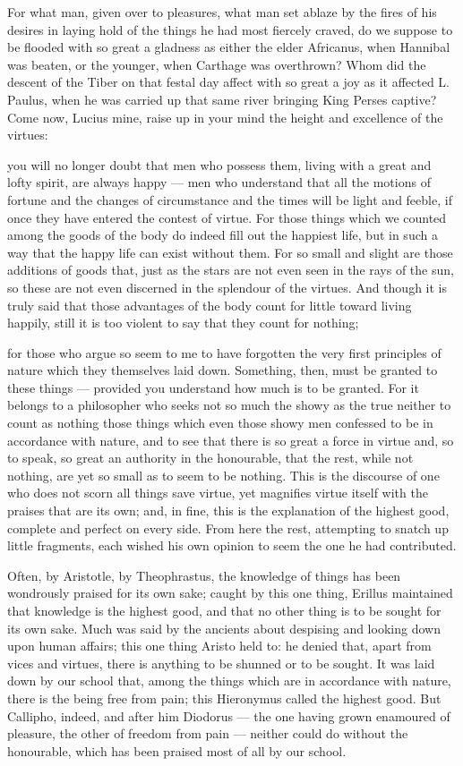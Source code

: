 For what man, given over to pleasures, what man set ablaze by the fires of his desires in laying hold of the things he had most fiercely craved, do we suppose to be flooded with so great a gladness as either the elder Africanus, when Hannibal was beaten, or the younger, when Carthage was overthrown? Whom did the descent of the Tiber on that festal day affect with so great a joy as it affected L. Paulus, when he was carried up that same river bringing King Perses captive? Come now, Lucius mine, raise up in your mind the height and excellence of the virtues:

 you will no longer doubt that men who possess them, living with a great and lofty spirit, are always happy — men who understand that all the motions of fortune and the changes of circumstance and the times will be light and feeble, if once they have entered the contest of virtue. For those things which we counted among the goods of the body do indeed fill out the happiest life, but in such a way that the happy life can exist without them. For so small and slight are those additions of goods that, just as the stars are not even seen in the rays of the sun, so these are not even discerned in the splendour of the virtues. And though it is truly said that those advantages of the body count for little toward living happily, still it is too violent to say that they count for nothing;

 for those who argue so seem to me to have forgotten the very first principles of nature which they themselves laid down. Something, then, must be granted to these things — provided you understand how much is to be granted. For it belongs to a philosopher who seeks not so much the showy as the true neither to count as nothing those things which even those showy men confessed to be in accordance with nature, and to see that there is so great a force in virtue and, so to speak, so great an authority in the honourable, that the rest, while not nothing, are yet so small as to seem to be nothing. This is the discourse of one who does not scorn all things save virtue, yet magnifies virtue itself with the praises that are its own; and, in fine, this is the explanation of the highest good, complete and perfect on every side. From here the rest, attempting to snatch up little fragments, each wished his own opinion to seem the one he had contributed.

 Often, by Aristotle, by Theophrastus, the knowledge of things has been wondrously praised for its own sake; caught by this one thing, Erillus maintained that knowledge is the highest good, and that no other thing is to be sought for its own sake. Much was said by the ancients about despising and looking down upon human affairs; this one thing Aristo held to: he denied that, apart from vices and virtues, there is anything to be shunned or to be sought. It was laid down by our school that, among the things which are in accordance with nature, there is the being free from pain; this Hieronymus called the highest good. But Callipho, indeed, and after him Diodorus — the one having grown enamoured of pleasure, the other of freedom from pain — neither could do without the honourable, which has been praised most of all by our school.

